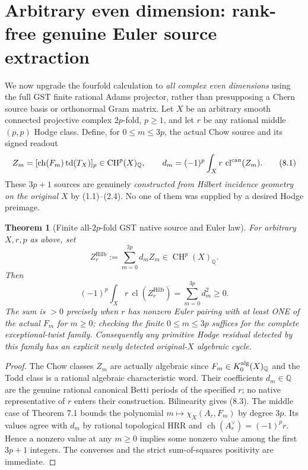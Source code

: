 \documentclass[11pt]{article}
\newcommand{\Q}{\mathbb Q}
\newcommand{\CH}{\operatorname{CH}}
\newcommand{\ch}{\operatorname{ch}}
\newcommand{\td}{\operatorname{td}}
\newcommand{\cl}{\operatorname{cl}}
\newcommand{\Hilb}{\operatorname{Hilb}}
\newtheorem{theorem}{Theorem}[section]
\begin{document}
\section{Arbitrary even dimension: rank-free genuine Euler source extraction}
We now upgrade the fourfold calculation to \emph{all complex even
dimensions} using the full GST finite rational Adams projector,
rather than presupposing a Chern source basis or orthonormal Gram
matrix. Let \(X\) be an arbitrary smooth connected projective
complex \(2p\)-fold, \(p\geq1\), and let \(r\) be any rational
middle \((p,p)\) Hodge class. Define, for
\(0\le m\le3p\), the actual Chow source and its signed readout
\[
 Z_m=[\ch(F_m)\td(T_X)]_p\in\CH^p(X)_\Q,\qquad
 d_m=(-1)^p\int_X r\,\cl^{\rm can}(Z_m).
                                                               \tag{8.1}
\]
These \(3p+1\) sources are genuinely \emph{constructed from
Hilbert incidence geometry on the original \(X\)} by (1.1)--(2.4).
No one of them was supplied by a desired Hodge preimage.

\begin{theorem}[Finite all-\(2p\)-fold GST native source and Euler law]
For arbitrary \(X,r,p\) as above, set
\[
 \boxed{Z_r^{\Hilb}:=\sum_{m=0}^{3p}d_mZ_m
            \in\CH^p(X)_\Q.}                        \tag{8.2}
\]
Then
\[
 \boxed{
 (-1)^p\int_X r\,\cl(Z_r^{\Hilb})
     =\sum_{m=0}^{3p}d_m^2\geq0.}                   \tag{8.3}
\]
The sum is \(>0\) precisely when \(r\) has nonzero
Euler pairing with at least ONE of the actual
\(F_m\) for \(m\ge0\); checking the finite
\(0\le m\le3p\) suffices for the complete
exceptional-twist family. Consequently any primitive
Hodge residual detected by this family has an
explicit newly detected original-\(X\) algebraic cycle.
\end{theorem}
\begin{proof}
The Chow classes \(Z_m\) are actually algebraic since
\(F_m\in K_0^{\rm alg}(X)_\Q\) and the Todd class is a
rational algebraic characteristic word. Their coefficients
\(d_m\in\Q\) are the genuine rational canonical Betti
periods of the specified \(r\); no native representative
of \(r\) enters their construction. Bilinearity gives
(8.3). The middle case of Theorem 7.1 bounds the
polynomial \(m\mapsto\chi_X(A_r,F_m)\) by degree \(3p\).
Its values agree with \(d_m\) by rational topological
HRR and \(\ch(A_r^\vee)=(-1)^p r\).
Hence a nonzero value at any \(m\ge0\) implies some
nonzero value among the first \(3p+1\) integers.
The converses and the strict sum-of-squares positivity
are immediate.
\end{proof}
\end{document}
